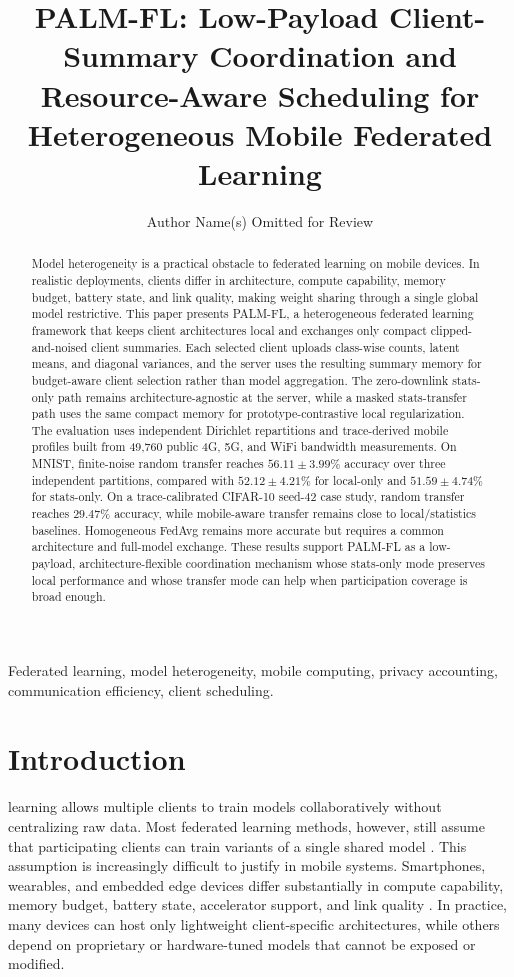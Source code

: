 \documentclass[10pt,journal]{IEEEtran}
\title{PALM-FL: Low-Payload Client-Summary Coordination and Resource-Aware Scheduling for Heterogeneous Mobile Federated Learning}
\author{Author Name(s) Omitted for Review}
\newcommand{\localonly}{local-only}
\newcommand{\statsonly}{stats-only}
\newcommand{\statstransfer}{stats-transfer}
\begin{document}
\maketitle

\begin{abstract}
Model heterogeneity is a practical obstacle to federated learning on mobile devices. In realistic deployments, clients differ in architecture, compute capability, memory budget, battery state, and link quality, making weight sharing through a single global model restrictive. This paper presents PALM-FL, a heterogeneous federated learning framework that keeps client architectures local and exchanges only compact clipped-and-noised client summaries. Each selected client uploads class-wise counts, latent means, and diagonal variances, and the server uses the resulting summary memory for budget-aware client selection rather than model aggregation. The zero-downlink \statsonly{} path remains architecture-agnostic at the server, while a masked \statstransfer{} path uses the same compact memory for prototype-contrastive local regularization. The evaluation uses independent Dirichlet repartitions and trace-derived mobile profiles built from 49,760 public 4G, 5G, and WiFi bandwidth measurements. On MNIST, finite-noise random transfer reaches $56.11\pm3.99\%$ accuracy over three independent partitions, compared with $52.12\pm4.21\%$ for \localonly{} and $51.59\pm4.74\%$ for \statsonly{}. On a trace-calibrated CIFAR-10 seed-42 case study, random transfer reaches $29.47\%$ accuracy, while mobile-aware transfer remains close to local/statistics baselines. Homogeneous FedAvg remains more accurate but requires a common architecture and full-model exchange. These results support PALM-FL as a low-payload, architecture-flexible coordination mechanism whose \statsonly{} mode preserves local performance and whose transfer mode can help when participation coverage is broad enough.
\end{abstract}

\begin{IEEEkeywords}
Federated learning, model heterogeneity, mobile computing, privacy accounting, communication efficiency, client scheduling.
\end{IEEEkeywords}

\section{Introduction}
 learning allows multiple clients to train models collaboratively without centralizing raw data. Most federated learning methods, however, still assume that participating clients can train variants of a single shared model \cite{fedavg,fedprox,scaffold}. This assumption is increasingly difficult to justify in mobile systems. Smartphones, wearables, and embedded edge devices differ substantially in compute capability, memory budget, battery state, accelerator support, and link quality \cite{pfeiffer,nguyen}. In practice, many devices can host only lightweight client-specific architectures, while others depend on proprietary or hardware-tuned models that cannot be exposed or modified.
\end{document}
